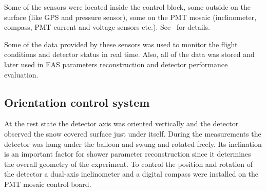 \documentclass[universe,article,submit,moreauthors,pdftex]{Definitions/mdpi}
\begin{document}

Some of the sensors were located inside the control block, some outside on the surface (like GPS and pressure sensor), some on the PMT mosaic (inclinometer, compass, PMT current and voltage sensors etc.). See~\cite{Ant20} for details.

Some of the data provided by these sensors was used to monitor the flight conditions and detector status in real time. Also, all of the data was stored and later used in EAS parameters reconstruction and detector performance evaluation.

\subsection{Orientation control system}
\label{sect:orientation}

At the rest state the detector axis was oriented vertically and the detector observed the snow covered surface just under itself. During the measurements the detector was hung under the balloon and swung and rotated freely. Its inclination is an important factor for shower parameter reconstruction since it determines the overall geometry of the experiment. To control the position and rotation of the detector a dual-axis inclinometer and a digital compass were installed on the PMT mosaic control board. 
\end{document}
